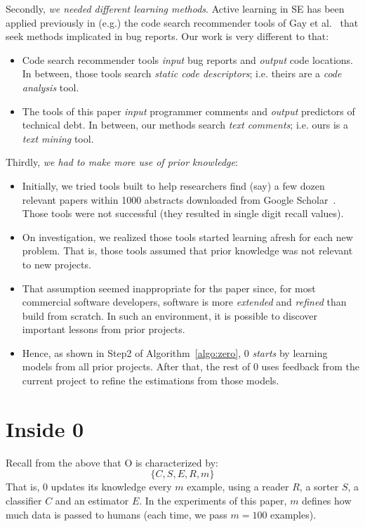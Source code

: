 \documentclass[10pt,conference]{IEEEtran}
\newcommand{\bi}{\begin{itemize}}
\newcommand{\ei}{\end{itemize}}
\begin{document}
Secondly, {\em we needed different learning methods}.
Active learning in SE has been applied previously in (e.g.) the code search recommender tools of
 Gay et al.~\cite{gay09}  that seek 
   methods   implicated in   bug reports.
Our work  is very different to that:
\bi
\item
 Code search recommender tools
  {\em  input} bug reports and {\em output} code locations. In between, those tools search {\em static code descriptors}; i.e. theirs are a   {\em code analysis} tool.
  \item
  The tools of this paper
\textit{input} programmer comments and \textit{output} predictors of   technical debt.
In between, our methods search {\em text comments};
i.e. ours is a
{\em text mining} tool.
\ei
Thirdly,
{\em we had to make more use of prior knowledge}:
\bi
\item
Initially, we tried tools built to help researchers find (say) a few dozen relevant papers
within 1000 abstracts downloaded from Google Scholar~\cite{yu2018finding}. Those tools were not successful
(they resulted in single digit recall values). 
\item
On investigation, we realized
those tools started  learning afresh for each new problem. That is, those tools assumed that prior knowledge was not
relevant to new projects.
\item 
That assumption seemed inappropriate for ths paper
since, for  most commercial software developers, software is more {\em extended} and 
{\em refined} than build from scratch.
In such an environment, it is possible to discover important lessons from prior projects.
\item
Hence, as shown in Step2 of Algorithm~\ref{algo:zero}, {\IT}0 {\em starts} by learning models
from all prior projects. After that, the rest of {\IT}0 uses feedback from the current
project to refine the estimations from those models.
\ei

 
\section{Inside {\IT}0}\label{section methodology}
 
\noindent
Recall from the above that {\IT}O is characterized by:
\[\{C,S,E,R,m\}\]
 That is, {\IT}0 updates its knowledge  every $m$ example, using  a  reader $R$, 
   a sorter $S$, a classifier $C$ and an estimator $E$. In the experiments of this paper, $m$ defines
 how much data is passed to humans (each time, we pass $m=100$ examples). 
 
\end{document}
